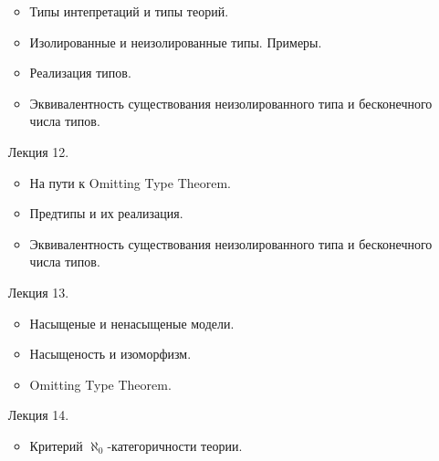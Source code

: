 \begin{enumerate}
        \begin{itemize}
            \item Типы интепретаций и типы теорий.
            \item Изолированные и неизолированные типы. Примеры.
            \item Реализация типов.
            \item Эквивалентность существования неизолированного типа и бесконечного числа типов.
        \end{itemize}
    \item[Лекция 12.]
        \begin{itemize}
            \item На пути к Omitting Type Theorem.
            \item Предтипы и их реализация.
            \item Эквивалентность существования неизолированного типа и бесконечного числа типов.
        \end{itemize}
    \item[Лекция 13.]
        \begin{itemize}
            \item Насыщеные и ненасыщеные модели.
            \item Насыщеность и изоморфизм.
            \item Omitting Type Theorem.
        \end{itemize}
    \item[Лекция 14.]
        \begin{itemize}
            \item Критерий $\aleph_0$-категоричности теории.
        \end{itemize}
\end{enumerate}